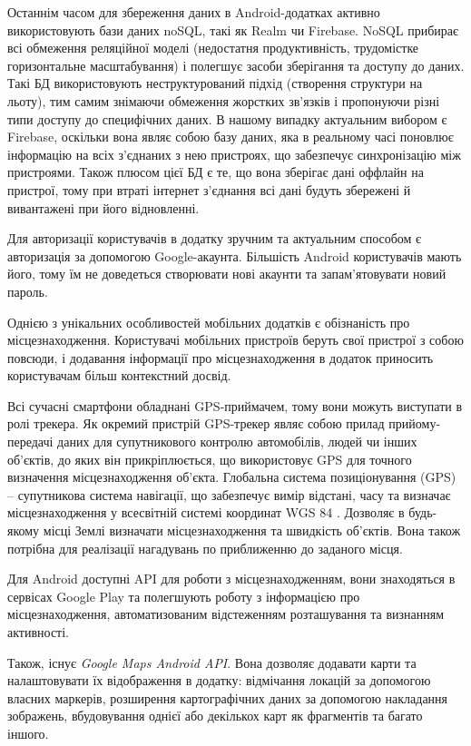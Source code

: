 \documentclass[../main.tex]{subfiles}
\begin{document}
Останнім часом для збереження даних в Android-додатках активно використовують бази даних noSQL, такі як Realm чи Firebase. NoSQL прибирає всі обмеження реляційної моделі (недостатня продуктивність, трудомістке горизонтальне масштабування) і полегшує засоби зберігання та доступу до даних. Такі БД використовують неструктурований підхід (створення структури на льоту), тим самим знімаючи обмеження жорстких зв'язків і пропонуючи різні типи доступу до специфічних даних. В нашому випадку актуальним вибором є Firebase, оскільки вона являє собою базу даних, яка в реальному часі поновлює інформацію на всіх з'єднаних з нею пристроях, що забезпечує синхронізацію між пристроями. Також плюсом цієї БД є те, що вона зберігає дані оффлайн на пристрої, тому при втраті інтернет з'єднання всі дані будуть збережені й вивантажені при його відновленні.

Для авторизації користувачів в додатку зручним та актуальним способом є авторизація за допомогою Google-акаунта. Більшість Android користувачів мають його, тому їм не доведеться створювати нові акаунти та запам'ятовувати новий пароль.

Однією з унікальних особливостей мобільних додатків є обізнаність про місцезнаходження. Користувачі мобільних пристроїв беруть свої пристрої з собою повсюди, і додавання інформації про місцезнаходження в додаток приносить користувачам більш контекстний досвід. 

Всі сучасні смартфони обладнані GPS-приймачем, тому вони можуть виступати в ролі трекера.  Як окремий пристрій GPS-трекер являє собою прилад прийому-передачі даних для супутникового контролю автомобілів, людей чи інших об'єктів, до яких він прикріплюється, що використовує GPS для точного визначення місцезнаходження об'єкта. Глобальна система позиціонування (GPS) – супутникова система навігації, що забезпечує вимір відстані, часу та визначає місцезнаходження у всесвітній системі координат WGS 84 \cite{gps}. Дозволяє в будь-якому місці Землі визначати місцезнаходження та швидкість об'єктів. Вона також потрібна для реалізації нагадувань по приближенню до заданого місця.

Для Android доступні API для роботи з місцезнаходженням, вони знаходяться в сервісах Google Play та полегшують роботу з інформацією про місцезнаходження, автоматизованим відстеженням розташування та визнанням активності. 

Також, існує \textit{Google Maps Android API}. Вона дозволяє додавати карти та налаштовувати їх відображення в додатку: відмічання локацій за допомогою власних маркерів, розширення картографічних даних за допомогою накладання зображень, вбудовування однієї або декількох карт як фрагментів та багато іншого.
\end{document}
